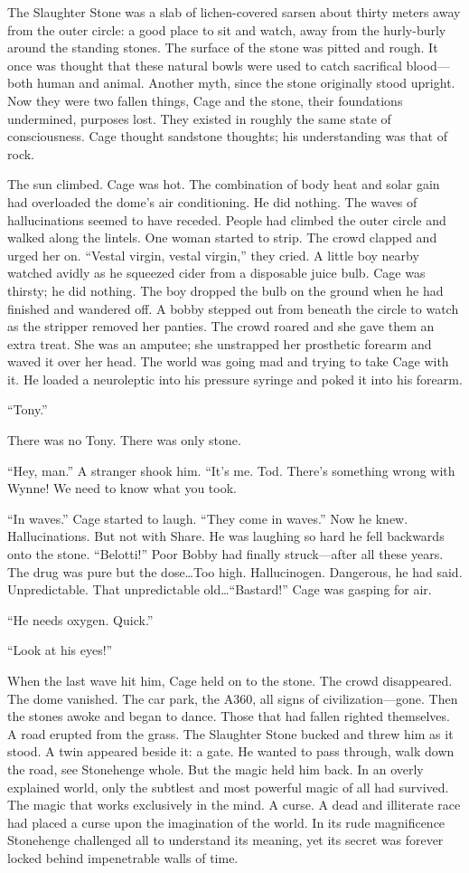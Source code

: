 The Slaughter Stone was a slab of lichen-covered sarsen about thirty meters away from the outer circle: a good place to sit and watch, away from the hurly-burly around the standing stones. The surface of the stone was pitted and rough. It once was thought that these natural bowls were used to catch sacrifical blood---both human and animal. Another myth, since the stone originally stood upright. Now they were two fallen things, Cage and the stone, their foundations undermined, purposes lost. They existed in roughly the same state of consciousness. Cage thought sandstone thoughts; his understanding was that of rock.

The sun climbed. Cage was hot. The combination of body heat and solar gain had overloaded the dome's air conditioning. He did nothing. The waves of hallucinations seemed to have receded. People had climbed the outer circle and walked along the lintels. One woman started to strip. The crowd clapped and urged her on. ``Vestal virgin, vestal virgin,'' they cried. A little boy nearby watched avidly as he squeezed cider from a disposable juice bulb. Cage was thirsty; he did nothing. The boy dropped the bulb on the ground when he had finished and wandered off. A bobby stepped out from beneath the circle to watch as the stripper removed her panties. The crowd roared and she gave them an extra treat. She was an amputee; she unstrapped her prosthetic forearm and waved it over her head. The world was going mad and trying to take Cage with it. He loaded a neuroleptic into his pressure syringe and poked it into his forearm.

``Tony.''

There was no Tony. There was only stone.

``Hey, man.'' A stranger shook him. ``It's me. Tod. There's something wrong with Wynne! We need to know what you took.

``In waves.'' Cage started to laugh. ``They come in waves.'' Now he knew. Hallucinations. But not with Share. He was laughing so hard he fell backwards onto the stone. ``Belotti!'' Poor Bobby had finally struck---after all these years. The drug was pure but the dose\ldots Too high. Hallucinogen. Dangerous, he had said. Unpredictable. That unpredictable old\ldots ``Bastard!'' Cage was gasping for air.

``He needs oxygen. Quick.''

``Look at his eyes!''

When the last wave hit him, Cage held on to the stone. The crowd disappeared. The dome vanished. The car park, the A360, all signs of civilization---gone. Then the stones awoke and began to dance. Those that had fallen righted themselves. A road erupted from the grass. The Slaughter Stone bucked and threw him as it stood. A twin appeared beside it: a gate. He wanted to pass through, walk down the road, see Stonehenge whole. But the magic held him back. In an overly explained world, only the subtlest and most powerful magic of all had survived. The magic that works exclusively in the mind. A curse. A dead and illiterate race had placed a curse upon the imagination of the world. In its rude magnificence Stonehenge challenged all to understand its meaning, yet its secret was forever locked behind impenetrable walls of time.

